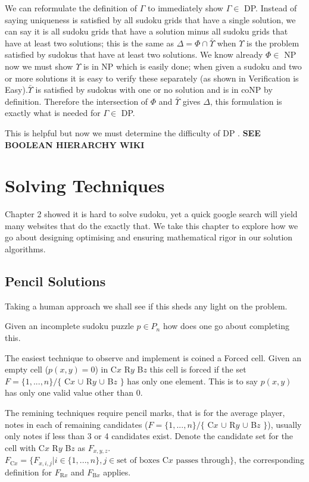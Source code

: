 \documentclass[a4paper,11pt]{report}
\begin{document}
We can reformulate the definition of $\Gamma$ to immediately show $\Gamma\in$ DP. Instead of saying uniqueness is satisfied by all sudoku grids that have a single solution, we can say it is all sudoku grids that have a solution minus all sudoku grids that have at least two solutions; this is the same as $\Delta = \Phi \cap \bar{\Upsilon}$ when $\Upsilon$ is the problem satisfied by sudokus that have at least two solutions. We know already $\Phi\in$ NP now we must show $\Upsilon$ is in NP which is easily done; when given a sudoku and two or more solutions it is easy to verify these separately (as shown in Verification is Easy).$\bar{\Upsilon}$ is satisfied by sudokus with one or no solution and is in coNP by definition. Therefore the intersection of $\Phi$ and $\bar{\Upsilon}$ gives $\Delta$, this formulation is exactly what is needed for $\Gamma\in$ DP.

This is helpful but now we must determine the difficulty of DP \cite{dphardness}. \textbf{SEE BOOLEAN HIERARCHY WIKI}
		

\chapter{Solving Techniques}
Chapter 2 showed it is hard to solve sudoku, yet a quick google search will yield many websites that do the exactly that. We take this chapter to explore how we go about designing optimising and ensuring mathematical rigor in our solution algorithms.
\section{Pencil Solutions}
Taking a human approach we shall see if this sheds any light on the problem.

Given an incomplete sudoku puzzle $p\in P_n$ how does one go about completing this.

The easiest technique to observe and implement is coined a Forced cell. Given an empty cell ($p(x,y)=0$) in C$x$ R$y$ B$z$ this cell is forced if the set $F=\{1,...,n\} / \{$ C$x$ $\cup$ R$y$ $\cup$ B$z$ $\}$ has only one element. This is to say $p(x,y)$ has only one valid value other than 0. 

The remining techniques require pencil marks, that is for the average player, notes in each of remaining candidates ($F=\{1,...,n\} / \{$ C$x$ $\cup$ R$y$ $\cup$ B$z$ $\}$), usually only notes if less than 3 or 4 candidates exist. Denote the candidate set for the cell with C$x$ R$y$ B$z$ as $F_{x,y,z}$. $F_{\text{C}x} = \{F_{x,i,j}|i\in\{1,...,n\}, j \in \text{set of boxes C$x$ passes through}\}$, the corresponding definition for $F_{\text{R}x}$ and $F_{\text{B}x}$ applies.
\end{document}

